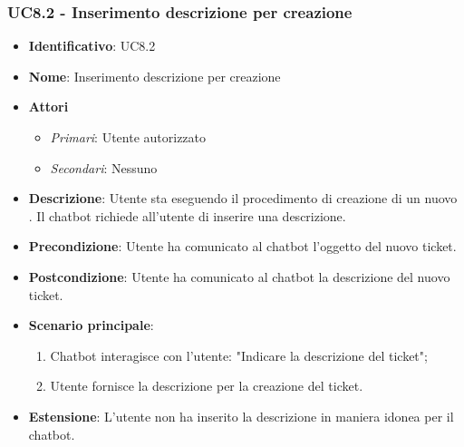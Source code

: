 \subsubsection{UC8.2 - Inserimento descrizione per creazione }
\begin{itemize}
	\item \textbf{Identificativo}: UC8.2
	\item \textbf{Nome}: Inserimento descrizione per creazione  
	\item \textbf{Attori}
	\begin{itemize} 
		\item \textit{Primari}: Utente autorizzato
		\item \textit{Secondari}: Nessuno
	\end{itemize}
	\item \textbf{Descrizione}:  Utente sta eseguendo il procedimento di creazione di un nuovo . Il chatbot richiede all'utente di inserire una descrizione. 
	\item \textbf{Precondizione}: Utente ha comunicato al chatbot l'oggetto del nuovo ticket.
	\item \textbf{Postcondizione}: Utente ha comunicato al chatbot la descrizione del nuovo ticket.
	\item \textbf{Scenario principale}: \begin{enumerate}
		\item Chatbot interagisce con l'utente: "Indicare la descrizione del ticket";
		\item Utente fornisce la descrizione per la creazione del ticket.
	\end{enumerate}
	\item \textbf{Estensione}: L'utente non ha inserito la descrizione in maniera idonea per il chatbot.
\end{itemize}
